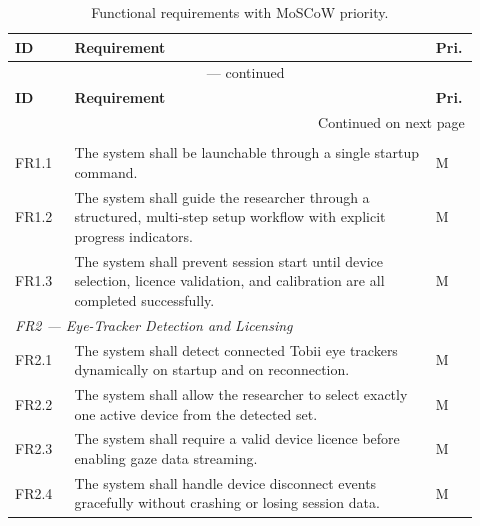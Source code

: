 \begingroup
\small
\begin{longtable}{%
  p{0.12\linewidth}
  p{0.73\linewidth}
  p{0.07\linewidth}
}
\caption{Functional requirements with MoSCoW priority.}
\label{tab:fr} \\
\toprule
\textbf{ID} & \textbf{Requirement} & \textbf{Pri.} \\
\midrule
\endfirsthead

\multicolumn{3}{c}{\tablename~\thetable{} — continued} \\
\toprule
\textbf{ID} & \textbf{Requirement} & \textbf{Pri.} \\
\midrule
\endhead

\midrule
\multicolumn{3}{r}{\footnotesize Continued on next page} \\
\endfoot

\bottomrule
\endlastfoot

\multicolumn{3}{l}{\textit{FR1 — System Execution and Setup}} \\
\midrule
FR1.1 & The system shall be launchable through a single startup command. & M \\
FR1.2 & The system shall guide the researcher through a structured, multi-step
        setup workflow with explicit progress indicators. & M \\
FR1.3 & The system shall prevent session start until device selection, licence
        validation, and calibration are all completed successfully. & M \\
\midrule

\multicolumn{3}{l}{\textit{FR2 — Eye-Tracker Detection and Licensing}} \\
\midrule
FR2.1 & The system shall detect connected Tobii eye trackers dynamically on
        startup and on reconnection. & M \\
FR2.2 & The system shall allow the researcher to select exactly one active
        device from the detected set. & M \\
FR2.3 & The system shall require a valid device licence before enabling gaze
        data streaming. & M \\
FR2.4 & The system shall handle device disconnect events gracefully without
        crashing or losing session data. & M \\
\midrule


\end{longtable}
